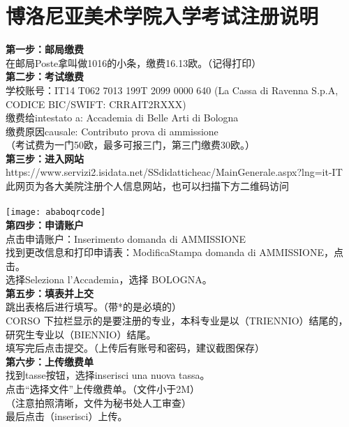 \section{博洛尼亚美术学院入学考试注册说明}
\textbf{第一步：邮局缴费}\\
在邮局Poste拿叫做1016的小条，缴费16.13欧。（记得打印）\\

\textbf{第二步：考试缴费}\\
学校账号：IT14 T062 7013 199T 2099 0000 640  (La Cassa di Ravenna S.p.A, CODICE BIC/SWIFT: CRRAIT2RXXX)\\
缴费给intestato a: Accademia di Belle Arti di Bologna \\
缴费原因causale: Contributo prova di ammissione\\
（考试费为一门50欧，最多可报三门，第三门缴费30欧。）\\

\textbf{第三步：进入网站}\\
https://www.servizi2.isidata.net/SSdidatticheac/MainGenerale.aspx?lng=it-IT\\
此网页为各大美院注册个人信息网站，也可以扫描下方二维码访问\\
\\
\texttt{[image: ababoqrcode]}\\

\textbf{第四步：申请账户}\\
点击申请账户：Inserimento domanda di AMMISSIONE\\
找到更改信息和打印申请表：ModificaStampa domanda di AMMISSIONE，点击。\\
选择Seleziona l’Accademia，选择 BOLOGNA。\\

\textbf{第五步：填表并上交}\\
跳出表格后进行填写。（带*的是必填的）\\
CORSO 下拉栏显示的是要注册的专业，本科专业是以（TRIENNIO）结尾的，研究生专业以（BIENNIO）结尾。\\
填写完后点击提交。（上传后有账号和密码，建议截图保存）\\

\textbf{第六步：上传缴费单}\\
找到tasse按钮，选择inserisci una nuova tassa。\\
点击“选择文件”上传缴费单。（文件小于2M）\\
（注意拍照清晰，文件为秘书处人工审查）\\
最后点击（inserisci）上传。\\

